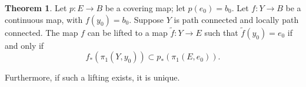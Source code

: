 \documentclass[12pt,a4paper]{book}
\newenvironment{prooff}{{\noindent\it\textcolor{cyan!40!black}{Proof}:}\,}{\par}
\theoremstyle{definition}
\newtheorem{theo}[defn]{Theorem}
\begin{document}
\begin{theo}
    Let $p: E \rightarrow B$ be a covering map; let $p\left(e_0\right)=b_0$. Let $f: Y \rightarrow B$ be a continuous map, with $f\left(y_0\right)=b_0$. Suppose $Y$ is path connected and locally path connected. The map $f$ can be lifted to a map $\tilde{f}: Y \rightarrow E$ such that $\tilde{f}\left(y_0\right)=e_0$ if and only if
    $$
        f_*\left(\pi_1\left(Y, y_0\right)\right) \subset p_*\left(\pi_1\left(E, e_0\right)\right) .
    $$

    Furthermore, if such a lifting exists, it is unique.
\end{theo}
\begin{prooff}






\end{prooff}
\end{document}
